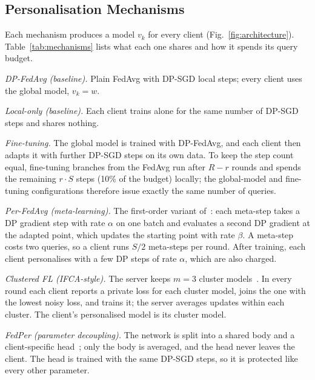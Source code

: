 \subsection{Personalisation Mechanisms}
Each mechanism produces a model $v_k$ for every client (Fig.~\ref{fig:architecture}). Table~\ref{tab:mechanisms} lists what each one shares and
how it spends its query budget.

\emph{DP-FedAvg (baseline).} Plain FedAvg with DP-SGD local steps; every client uses the global model, $v_k=w$.

\emph{Local-only (baseline).} Each client trains alone for the same number of DP-SGD steps and shares nothing.

\emph{Fine-tuning.} The global model is trained with DP-FedAvg, and each client then adapts it with further DP-SGD
steps on its own data. To keep the step count equal, fine-tuning branches from the FedAvg run after $R-r$ rounds and
spends the remaining $r\cdot S$ steps (10\% of the budget) locally; the global-model and fine-tuning configurations
therefore issue exactly the same number of queries.

\emph{Per-FedAvg (meta-learning).} The first-order variant of~\cite{fallah2020personalized}: each meta-step takes a
DP gradient step with rate $\alpha$ on one batch and evaluates a second DP gradient at the adapted point, which
updates the starting point with rate $\beta$. A meta-step costs two queries, so a client runs $S/2$ meta-steps per
round. After training, each client personalises with a few DP steps of rate $\alpha$, which are also charged.

\emph{Clustered FL (IFCA-style).} The server keeps $m=3$ cluster models~\cite{ghosh2022efficient}. In every round each
client reports a private loss for each cluster model, joins the one with the lowest noisy loss, and trains it; the
server averages updates within each cluster. The client's personalised model is its cluster model.

\emph{FedPer (parameter decoupling).} The network is split into a shared body and a client-specific
head~\cite{arivazhagan2019federated}; only the body is averaged, and the head never leaves the client. The head is
trained with the same DP-SGD steps, so it is protected like every other parameter.

